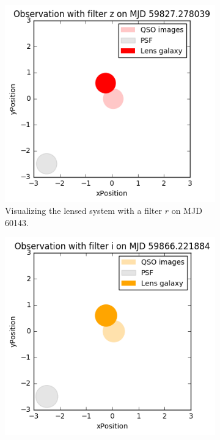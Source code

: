 \documentclass[\docopts]{\docclass}
\begin{document}
\begin{figure}
    \centering
    \begin{subfigure}[b]{0.2\textwidth}
        \includegraphics[width=\textwidth]{plot-a.png}
        \caption{Visualizing the lensed system with a filter $r$ on MJD 60143.}
        \label{fig:vis_lens_a}
    \end{subfigure}
    \begin{subfigure}[b]{0.2\textwidth}
        \includegraphics[width=\textwidth]{plot-b.png}

\end{subfigure}
\end{figure}
\end{document}
